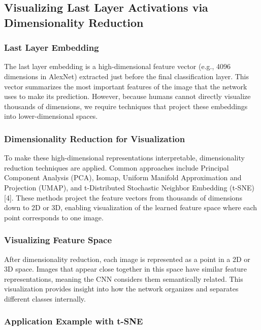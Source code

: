 \documentclass{article}
\renewcommand{\cite}[1]{[#1]}
\begin{document}
\subsection{Visualizing Last Layer Activations via Dimensionality Reduction}

\subsubsection{Last Layer Embedding}

The last layer embedding is a high-dimensional feature vector (e.g., 4096 dimensions in AlexNet) extracted just before the final classification layer. This vector summarizes the most important features of the image that the network uses to make its prediction. However, because humans cannot directly visualize thousands of dimensions, we require techniques that project these embeddings into lower-dimensional spaces.

\subsubsection{Dimensionality Reduction for Visualization}

To make these high-dimensional representations interpretable, dimensionality reduction techniques are applied. Common approaches include Principal Component Analysis (PCA), Isomap, Uniform Manifold Approximation and Projection (UMAP), and t-Distributed Stochastic Neighbor Embedding (t-SNE) \cite{4}. These methods project the feature vectors from thousands of dimensions down to 2D or 3D, enabling visualization of the learned feature space where each point corresponds to one image.

\subsubsection{Visualizing Feature Space}

After dimensionality reduction, each image is represented as a point in a 2D or 3D space. Images that appear close together in this space have similar feature representations, meaning the CNN considers them semantically related. This visualization provides insight into how the network organizes and separates different classes internally.

\subsubsection{Application Example with t-SNE}
\end{document}
